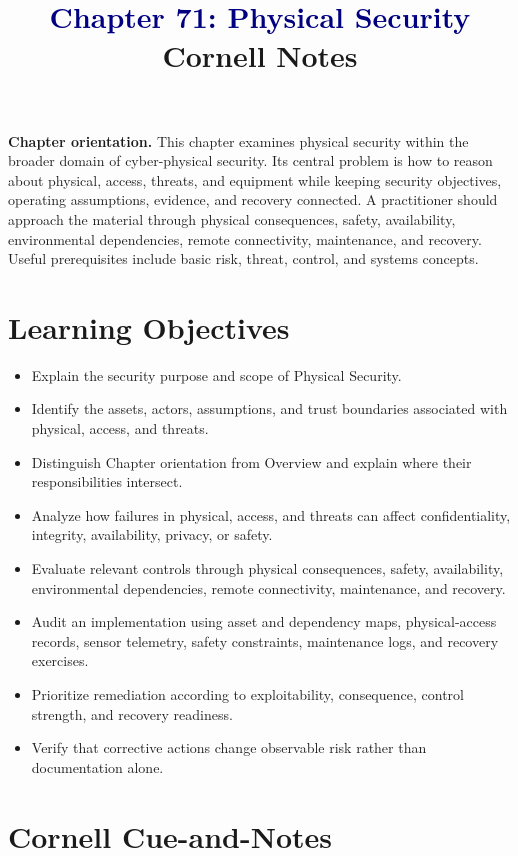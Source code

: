 \documentclass[11pt]{article}
\title{\textcolor{Navy}{Chapter 71: Physical Security}\\[2mm]\large Cornell Notes}
\author{}
\date{}
\begin{document}
\maketitle
\thispagestyle{fancy}
\vspace{-1.5em}
\begin{orientationbox}
\textbf{Chapter orientation.} This chapter examines physical security within the broader domain of cyber-physical security. Its central problem is how to reason about physical, access, threats, and equipment while keeping security objectives, operating assumptions, evidence, and recovery connected. A practitioner should approach the material through physical consequences, safety, availability, environmental dependencies, remote connectivity, maintenance, and recovery. Useful prerequisites include basic risk, threat, control, and systems concepts.
\end{orientationbox}
\section*{Learning Objectives}
\begin{itemize}
\item Explain the security purpose and scope of Physical Security.
\item Identify the assets, actors, assumptions, and trust boundaries associated with physical, access, and threats.
\item Distinguish Chapter orientation from Overview and explain where their responsibilities intersect.
\item Analyze how failures in physical, access, and threats can affect confidentiality, integrity, availability, privacy, or safety.
\item Evaluate relevant controls through physical consequences, safety, availability, environmental dependencies, remote connectivity, maintenance, and recovery.
\item Audit an implementation using asset and dependency maps, physical-access records, sensor telemetry, safety constraints, maintenance logs, and recovery exercises.
\item Prioritize remediation according to exploitability, consequence, control strength, and recovery readiness.
\item Verify that corrective actions change observable risk rather than documentation alone.
\end{itemize}
\section*{Cornell Cue-and-Notes}
\end{document}
